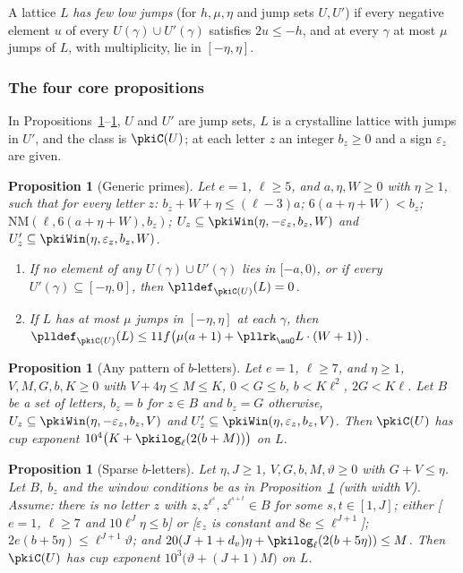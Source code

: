\documentclass[10pt]{amsart}
\newtheorem{proposition}[theorem]{Proposition}
\theoremstyle{definition}
\theoremstyle{remark}
\begin{document}
A lattice $L$ \emph{has few low jumps} (for $h,\mu,\eta$ and jump sets $U,U'$) if every negative
element $u$ of every $U(\gamma)\cup U'(\gamma)$ satisfies $2u\le-h$, and at every $\gamma$ at most
$\mu$ jumps of $L$, with multiplicity, lie in $[-\eta,\eta]$.

\subsubsection*{The four core propositions}

In Propositions~\ref{pki:generic}--\ref{pki:sparse}, $U$ and $U'$ are jump sets, $L$ is a crystalline
lattice with jumps in $U'$, and the class is $\pkiC(U)$; at each letter $z$ an integer $b_z\ge0$
and a sign $\varepsilon_z$ are given.

\begin{proposition}[Generic primes]\label{pki:generic}
Let $e=1$, $\ell\ge5$, and $a,\eta,W\ge0$ with $\eta\ge1$, such that for every letter $z$:
$b_z+W+\eta\le(\ell-3)a$; $6(a+\eta+W)<b_z$; $\mathrm{NM}(\ell,6(a+\eta+W),b_z)$; $U_z\subseteq
\pkiWin(\eta,-\varepsilon_z,b_z,W)$ and $U'_z\subseteq\pkiWin(\eta,\varepsilon_z,b_z,W)$.
\begin{enumerate}
\item[(i)] If no element of any $U(\gamma)\cup U'(\gamma)$ lies in $[-a,0)$, or if every
$U'(\gamma)\subseteq[-\eta,0]$, then $\plldef_{\pkiC(U)}(L)=0$.
\item[(ii)] If $L$ has at most $\mu$ jumps in $[-\eta,\eta]$ at each $\gamma$, then
$\plldef_{\pkiC(U)}(L)\le11f\bigl(\mu(a+1)+\pllrk_\auO L\cdot(W+1)\bigr)$.
\end{enumerate}
\end{proposition}

\begin{proposition}[Any pattern of $b$-letters]\label{pki:any}
Let $e=1$, $\ell\ge7$, and $\eta\ge1$, $V,M,G,b,K\ge0$ with $V+4\eta\le M\le K$, $0<G\le b$,
$b<K\ell^2$, $2G<K\ell$. Let $B$ be a set of letters, $b_z=b$ for $z\in B$ and $b_z=G$ otherwise,
$U_z\subseteq\pkiWin(\eta,-\varepsilon_z,b_z,V)$ and $U'_z\subseteq\pkiWin(\eta,\varepsilon_z,b_z,V)$.
Then $\pkiC(U)$ has cup exponent $10^4\bigl(K+\pkilog_\ell(2(b+M))\bigr)$ on $L$.
\end{proposition}

\begin{proposition}[Sparse $b$-letters]\label{pki:sparse}
Let $\eta,J\ge1$, $V,G,b,M,\vartheta\ge0$ with $G+V\le\eta$. Let $B$, $b_z$ and the window
conditions be as in Proposition~\ref{pki:any} (with width $V$). Assume: there is no letter $z$ with
$z,z^{\ell^s},z^{\ell^{s+t}}\in B$ for some $s,t\in[1,J]$; either [$e=1$, $\ell\ge7$ and
$10\ell^J\eta\le b$] or [$\varepsilon_z$ is constant and $8e\le\ell^{J+1}$];
$2e(b+5\eta)\le\ell^{J+1}\vartheta$; and $20(J+1+d_v)\eta+\pkilog_\ell(2(b+5\eta))\le M$. Then
$\pkiC(U)$ has cup exponent $10^3\bigl(\vartheta+(J+1)M\bigr)$ on $L$.
\end{proposition}
\end{document}
